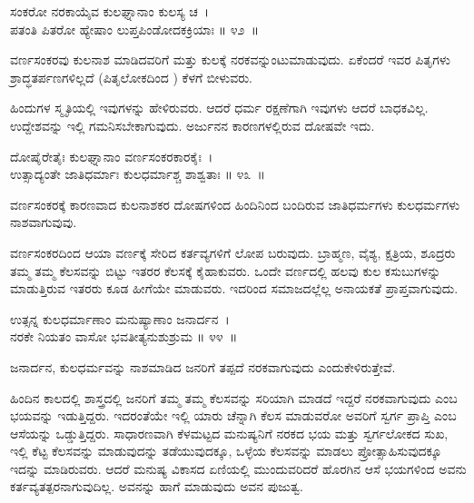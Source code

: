 \begin{shloka}
ಸಂಕರೋ ನರಕಾಯೈವ ಕುಲಘ್ನಾನಾಂ ಕುಲಸ್ಯ ಚ~।\\ಪತಂತಿ ಪಿತರೋ ಹ್ಯೇಷಾಂ ಲುಪ್ತಪಿಂಡೋದಕಕ್ರಿಯಾಃ \hfill॥ ೪೨~॥
\end{shloka}

\begin{artha}
ವರ್ಣಸಂಕರವು ಕುಲನಾಶ ಮಾಡಿದವರಿಗೆ ಮತ್ತು ಕುಲಕ್ಕೆ ನರಕವನ್ನುಂಟುಮಾಡುವುದು. ಏಕೆಂದರೆ ಇವರ ಪಿತೃಗಳು ಶ್ರಾದ್ಧತರ್ಪಣಗಳಿಲ್ಲದೆ (ಪಿತೃಲೋಕದಿಂದ ) ಕೆಳಗೆ ಬೀಳುವರು.
\end{artha}

ಹಿಂದುಗಳ ಸ್ಮೃತಿಯಲ್ಲಿ ಇವುಗಳನ್ನು ಹೇಳಿರುವರು. ಆದರೆ ಧರ್ಮ ರಕ್ಷಣೆಗಾಗಿ ಇವುಗಳು ಆದರೆ ಬಾಧಕವಿಲ್ಲ. ಉದ್ದೇಶವನ್ನು ಇಲ್ಲಿ ಗಮನಿಸಬೇಕಾಗುವುದು. ಅರ್ಜುನನ ಕಾರಣಗಳಲ್ಲಿರುವ ದೋಷವೇ ಇದು.

\begin{shloka}
ದೋಷೈರೇತೈಃ ಕುಲಘ್ನಾನಾಂ ವರ್ಣಸಂಕರಕಾರಕೈಃ~।\\ಉತ್ಸಾದ್ಯಂತೇ ಜಾತಿಧರ್ಮಾಃ ಕುಲಧರ್ಮಾಶ್ಚ ಶಾಶ್ವತಾಃ \hfill॥ ೪೩~॥
\end{shloka}

\newpage

\begin{artha}
ವರ್ಣಸಂಕರಕ್ಕೆ ಕಾರಣವಾದ ಕುಲನಾಶಕರ ದೋಷಗಳಿಂದ ಹಿಂದಿನಿಂದ ಬಂದಿರುವ ಜಾತಿಧರ್ಮಗಳು ಕುಲಧರ್ಮಗಳು ನಾಶವಾಗುವುವು.
\end{artha}

ವರ್ಣಸಂಕರದಿಂದ ಆಯಾ ವರ್ಣಕ್ಕೆ ಸೇರಿದ ಕರ್ತವ್ಯಗಳಿಗೆ ಲೋಪ ಬರುವುದು. ಬ್ರಾಹ್ಮಣ, ವೈಶ್ಯ, ಕ್ಷತ್ರಿಯ, ಶೂದ್ರರು ತಮ್ಮ ತಮ್ಮ ಕೆಲಸವನ್ನು ಬಿಟ್ಟು ಇತರರ ಕೆಲಸಕ್ಕೆ ಕೈಹಾಕುವರು. ಒಂದೇ ವರ್ಣದಲ್ಲಿ ಹಲವು ಕುಲ ಕಸುಬುಗಳನ್ನು ಮಾಡುತ್ತಿರುವ ಇತರರು ಕೂಡ ಹೀಗೆಯೇ ಮಾಡುವರು. ಇದರಿಂದ ಸಮಾಜದಲ್ಲೆಲ್ಲ ಅನಾಯಕತೆ ಪ್ರಾಪ್ತವಾಗುವುದು.

\begin{shloka}
ಉತ್ಸನ್ನ ಕುಲಧರ್ಮಾಣಾಂ ಮನುಷ್ಯಾಣಾಂ ಜನಾರ್ದನ~।\\ನರಕೇ ನಿಯತಂ ವಾಸೋ ಭವತೀತ್ಯನುಶುಶ್ರುಮ \hfill॥ ೪೪~॥
\end{shloka}

\begin{artha}
ಜನಾರ್ದನ, ಕುಲಧರ್ಮವನ್ನು ನಾಶಮಾಡಿದ ಜನರಿಗೆ ತಪ್ಪದೆ ನರಕವಾಗುವುದು ಎಂದು\break ಕೇಳಿರುತ್ತೇವೆ.
\end{artha}

ಹಿಂದಿನ ಕಾಲದಲ್ಲಿ ಶಾಸ್ತ್ರದಲ್ಲಿ ಜನರಿಗೆ ತಮ್ಮ ತಮ್ಮ ಕೆಲಸವನ್ನು ಸರಿಯಾಗಿ ಮಾಡದೆ ಇದ್ದರೆ ನರಕವಾಗುವುದು ಎಂಬ ಭಯವನ್ನು ಇಡುತ್ತಿದ್ದರು. ಇದರಂತೆಯೇ ಇಲ್ಲಿ ಯಾರು ಚೆನ್ನಾಗಿ ಕೆಲಸ ಮಾಡುವರೋ ಅವರಿಗೆ ಸ್ವರ್ಗ ಪ್ರಾಪ್ತಿ ಎಂಬ ಆಸೆಯನ್ನು ಒಡ್ಡುತ್ತಿದ್ದರು. ಸಾಧಾರಣವಾಗಿ ಕೆಳಮಟ್ಟದ ಮನುಷ್ಯನಿಗೆ ನರಕದ ಭಯ ಮತ್ತು ಸ್ವರ್ಗಲೋಕದ ಸುಖ, ಇಲ್ಲಿ ಕೆಟ್ಟ ಕೆಲಸವನ್ನು ಮಾಡುವುದನ್ನು ತಡೆಯುವುದಕ್ಕೂ, ಒಳ್ಳೆಯ ಕೆಲಸವನ್ನು ಮಾಡಲು ಪ್ರೋತ್ಸಾಹಿಸುವುದಕ್ಕೂ ಇದನ್ನು ಮಾಡಿರುವರು. ಆದರೆ ಮನುಷ್ಯ ವಿಕಾಸದ ಏಣಿಯಲ್ಲಿ ಮುಂದುವರಿದರೆ ಹೊರಗಿನ ಆಸೆ ಭಯಗಳಿಂದ ಅವನು ಕರ್ತವ್ಯತತ್ಪರನಾಗುವುದಿಲ್ಲ. ಅವನನ್ನು ಹಾಗೆ ಮಾಡುವುದು ಅವನ ಪುಜುತ್ವ.

